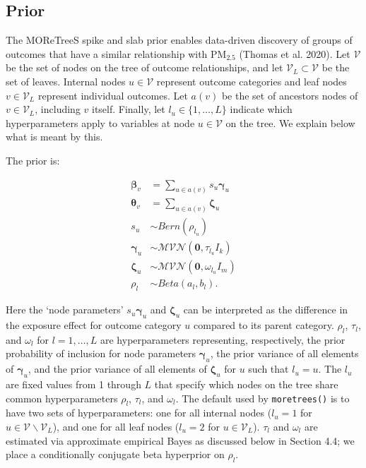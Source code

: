 \documentclass[]{article}
\begin{document}
\hypertarget{prior}{%
\subsection{Prior}\label{prior}}

The MOReTreeS spike and slab prior enables data-driven discovery of
groups of outcomes that have a similar relationship with PM\(_{2.5}\)
(Thomas et al. 2020). Let \(\mathcal{V}\) be the set of nodes on the
tree of outcome relationships, and let
\(\mathcal{V}_L \subset \mathcal{V}\) be the set of leaves. Internal
nodes \(u \in \mathcal{V}\) represent outcome categories and leaf nodes
\(v \in \mathcal{V}_L\) represent individual outcomes. Let \(a(v)\) be
the set of ancestors nodes of \(v \in \mathcal{V}_L\), including \(v\)
itself. Finally, let \(l_u \in \lbrace 1, \dots, L \rbrace\) indicate
which hyperparameters apply to variables at node \(u \in \mathcal{V}\)
on the tree. We explain below what is meant by this.

The prior is:

\begin{align*}
\boldsymbol{\beta}_v & = \sum_{u \in a(v)} s_u \boldsymbol{\gamma}_u \\
\boldsymbol{\theta}_v & = \sum_{u \in a(v)} \boldsymbol{\zeta}_u \\
s_u & \sim Bern(\rho_{l_u}) \\
\boldsymbol{\gamma}_u & \sim \mathcal{MVN}\left(\boldsymbol{0},\tau_{l_u} I_k\right) \\
\boldsymbol{\zeta}_u & \sim \mathcal{MVN} \left( \boldsymbol{0}, \omega_{l_u} I_m \right) \\
\rho_{l} & \sim Beta(a_l, b_l).
\end{align*}

Here the `node parameters' \(s_u \boldsymbol{\gamma}_u\) and
\(\boldsymbol{\zeta}_u\) can be interpreted as the difference in the
exposure effect for outcome category \(u\) compared to its parent
category. \(\rho_l\), \(\tau_l\), and \(\omega_l\) for
\(l = 1, \dots, L\) are hyperparameters representing, respectively, the
prior probability of inclusion for node parameters
\(\boldsymbol{\gamma}_u\), the prior variance of all elements of
\(\boldsymbol{\gamma}_u\), and the prior variance of all elements of
\(\boldsymbol{\zeta}_u\) for \(u\) such that \(l_u = u\). The \(l_u\)
are fixed values from 1 through \(L\) that specify which nodes on the
tree share common hyperparameters \(\rho_l\), \(\tau_l\), and
\(\omega_l\). The default used by \texttt{moretrees()} is to have two
sets of hyperparameters: one for all internal nodes (\(l_u = 1\) for
\(u \in \mathcal{V} \backslash \mathcal{V}_L\)), and one for all leaf
nodes (\(l_u = 2\) for \(u \in \mathcal{V}_L\)). \(\tau_l\) and
\(\omega_l\) are estimated via approximate empirical Bayes as discussed
below in Section 4.4; we place a conditionally conjugate beta hyperprior
on \(\rho_l\).
\end{document}
